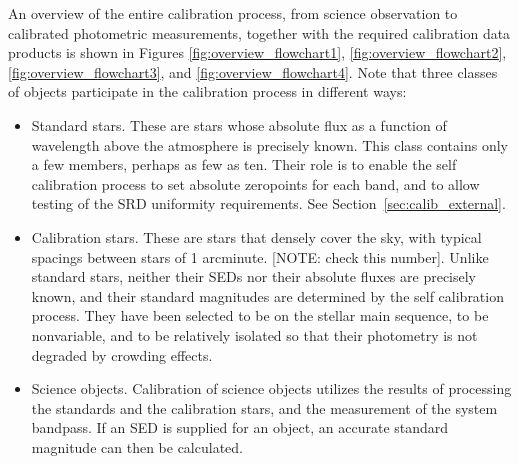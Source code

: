 \documentclass[12pt,preprint]{aastex}
\begin{document}
An overview of the entire calibration process, from science observation
to calibrated photometric measurements, together with the required
calibration data products is shown in
Figures \ref{fig:overview_flowchart1}, \ref{fig:overview_flowchart2}, 
\ref{fig:overview_flowchart3}, and \ref{fig:overview_flowchart4}.  
Note that three classes of objects participate in the calibration process in different ways:
\begin{itemize}
\item Standard stars.  These are stars whose absolute flux as a function of wavelength above the atmosphere is precisely known.  This class contains only a few members, perhaps as few as ten.  Their role is to enable the self calibration process to set absolute zeropoints for each band, and to allow testing of the SRD uniformity requirements.  See Section~\ref{sec:calib_external}.
\item Calibration stars.  These are stars that densely cover the sky, with typical spacings between stars of 1 arcminute. [NOTE: check this number].  Unlike standard stars, neither their SEDs nor their absolute fluxes are precisely known, and their standard magnitudes are determined by the self calibration process.   They have been selected to be on the stellar main sequence, to be nonvariable, and to be relatively isolated so that their photometry is not degraded by crowding effects.
\item Science objects.  Calibration of science objects utilizes the results of processing the standards and the calibration stars, and the measurement of the system bandpass.   If an SED is supplied for an object, an accurate standard magnitude can then be calculated.
\end{itemize}
\end{document}
